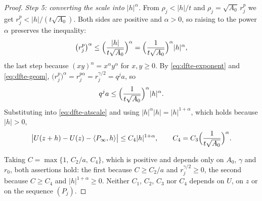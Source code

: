 \begin{proof}
\emph{Step 5: converting the scale into $|h|^{\alpha}$.}
From $\rho_j<|h|/t$ and $\rho_j=\sqrt{A_0}\,r_j^{p}$ we get
$r_j^{p}<|h|/(t\sqrt{A_0})$. Both sides are positive and $\alpha>0$, so raising
to the power $\alpha$ preserves the inequality:
\[
  \bigl(r_j^{p}\bigr)^{\alpha}
   \le\Bigl(\frac{|h|}{t\sqrt{A_0}}\Bigr)^{\alpha}
   =\Bigl(\frac1{t\sqrt{A_0}}\Bigr)^{\alpha}|h|^{\alpha},
\]
the last step because $(xy)^{\alpha}=x^{\alpha}y^{\alpha}$ for $x,y\ge0$. By
\eqref{eq:dfte-exponent} and \eqref{eq:dfte-geom},
$\bigl(r_j^{p}\bigr)^{\alpha}=r_j^{p\alpha}=r_j^{\gamma/2}=q^{j}a$, so
\[
  q^{j}a\le\Bigl(\frac1{t\sqrt{A_0}}\Bigr)^{\alpha}|h|^{\alpha} .
\]
Substituting into \eqref{eq:dfte-atscale} and using
$|h|^{\alpha}|h|=|h|^{1+\alpha}$, which holds because $|h|>0$,
\[
  \bigl|U(z+h)-U(z)-\langle P_\infty,h\rangle\bigr|
   \le C_4|h|^{1+\alpha},\qquad
  C_4=C_3\Bigl(\frac1{t\sqrt{A_0}}\Bigr)^{\alpha}.
\]

Taking $C=\max\{1,\,C_2/a,\,C_4\}$, which is positive and depends only on
$A_0$, $\gamma$ and $r_0$, both assertions hold: the first because
$C\ge C_2/a$ and $r_j^{\gamma/2}\ge0$, the second because $C\ge C_4$ and
$|h|^{1+\alpha}\ge0$. Neither $C_1$, $C_2$, $C_3$ nor $C_4$ depends on $U$,
on $z$ or on the sequence $(P_j)$.
\end{proof}

